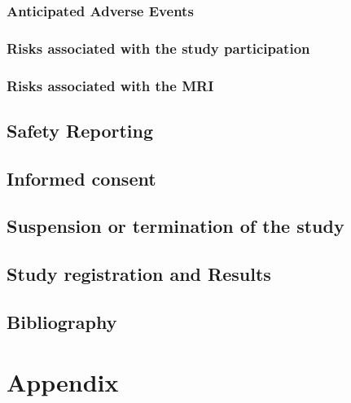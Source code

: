 \subsection{Anticipated Adverse Events}

\subsection{Risks associated with the study participation}

\subsection{Risks associated with the \ac{MRI}}

\section{Safety Reporting}

\section{Informed consent}

\section{Suspension or termination of the study}

\section{Study registration and Results}

\section{Bibliography}

\chapter{Appendix}
